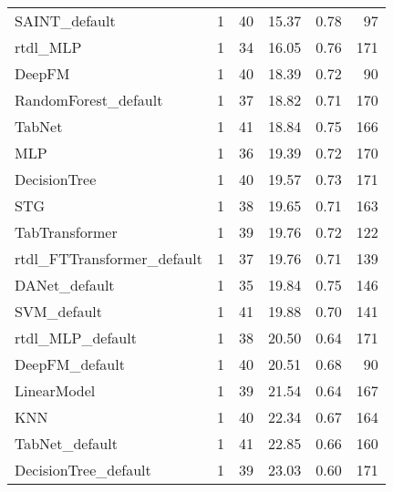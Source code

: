 \begin{tabular}{lrrrrr}
SAINT_default              &                  1 &  40 &  15.37 &                           0.78 &    97 \\
rtdl_MLP                   &                  1 &  34 &  16.05 &                           0.76 &   171 \\
DeepFM                     &                  1 &  40 &  18.39 &                           0.72 &    90 \\
RandomForest_default       &                  1 &  37 &  18.82 &                           0.71 &   170 \\
TabNet                     &                  1 &  41 &  18.84 &                           0.75 &   166 \\
MLP                        &                  1 &  36 &  19.39 &                           0.72 &   170 \\
DecisionTree               &                  1 &  40 &  19.57 &                           0.73 &   171 \\
STG                        &                  1 &  38 &  19.65 &                           0.71 &   163 \\
TabTransformer             &                  1 &  39 &  19.76 &                           0.72 &   122 \\
rtdl_FTTransformer_default &                  1 &  37 &  19.76 &                           0.71 &   139 \\
DANet_default              &                  1 &  35 &  19.84 &                           0.75 &   146 \\
SVM_default                &                  1 &  41 &  19.88 &                           0.70 &   141 \\
rtdl_MLP_default           &                  1 &  38 &  20.50 &                           0.64 &   171 \\
DeepFM_default             &                  1 &  40 &  20.51 &                           0.68 &    90 \\
LinearModel                &                  1 &  39 &  21.54 &                           0.64 &   167 \\
KNN                        &                  1 &  40 &  22.34 &                           0.67 &   164 \\
TabNet_default             &                  1 &  41 &  22.85 &                           0.66 &   160 \\
DecisionTree_default       &                  1 &  39 &  23.03 &                           0.60 &   171 \\

\end{tabular}

